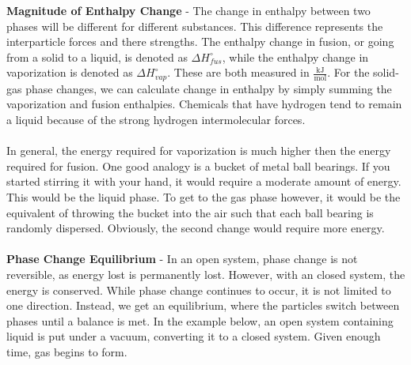 \documentclass{article}
\begin{document}
\vspace{15pt}
\noindent\textbf{Magnitude of Enthalpy Change} - The change in enthalpy between two phases will be different for different substances. This difference represents the interparticle forces and there strengths. The enthalpy change in fusion, or going from a solid to a liquid, is denoted as $\Delta H^{\circ}_{fus}$, while the enthalpy change in vaporization is denoted as $\Delta H^{\circ}_{vap}$. These are both measured in $\frac{\text{kJ}}{\text{mol}}$. For the solid-gas phase changes, we can calculate change in enthalpy by simply summing the vaporization and fusion enthalpies. Chemicals that have hydrogen tend to remain a liquid because of the strong hydrogen intermolecular forces.\\
\\
In general, the energy required for vaporization is much higher then the energy required for fusion. One good analogy is a bucket of metal ball bearings. If you started stirring it with your hand, it would require a moderate amount of energy. This would be the liquid phase. To get to the gas phase however, it would be the equivalent of throwing the bucket into the air such that each ball bearing is randomly dispersed. Obviously, the second change would require more energy. \\
\\
\textbf{Phase Change Equilibrium} - In an open system, phase change is not reversible, as energy lost is permanently lost. However, with an closed system, the energy is conserved. While phase change continues to occur, it is not limited to one direction. Instead, we get an equilibrium, where the particles switch between phases until a balance is met. In the example below, an open system containing liquid is put under a vacuum, converting it to a closed system. Given enough time, gas begins to form. 
\vspace{15pt} 
\end{document}
